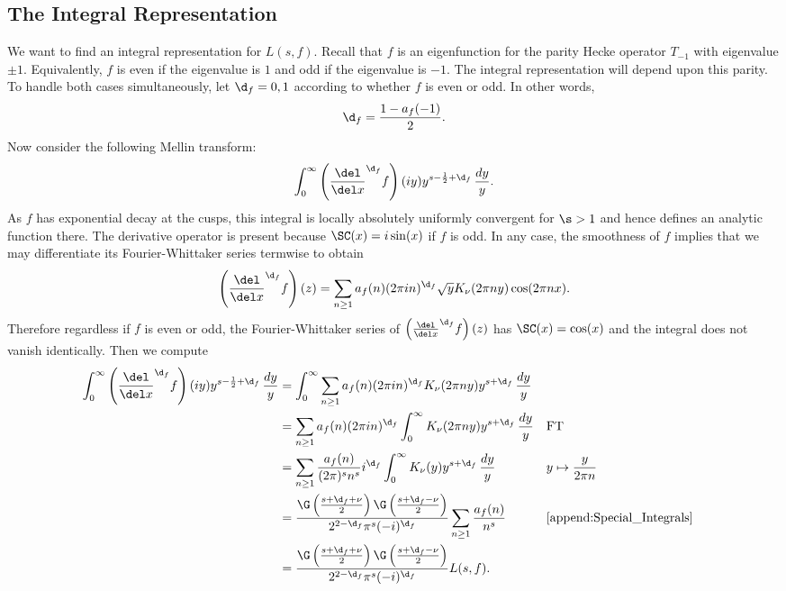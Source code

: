     \subsection*{The Integral Representation}
      We want to find an integral representation for $L(s,f)$. Recall that $f$ is an eigenfunction for the parity Hecke operator $T_{-1}$ with eigenvalue $\pm 1$. Equivalently, $f$ is even if the eigenvalue is $1$ and odd if the eigenvalue is $-1$. The integral representation will depend upon this parity. To handle both cases simultaneously, let $\d_{f} = 0,1$ according to whether $f$ is even or odd. In other words,
      \[
        \d_{f} = \frac{1-a_{f}(-1)}{2}.
      \]
      Now consider the following Mellin transform:
      \[
        \int_{0}^{\infty}\left(\frac{\del}{\del x}^{\d_{f}}f\right)(iy)y^{s-\frac{1}{2}+\d_{f}}\,\frac{dy}{y}.
      \]
      As $f$ has exponential decay at the cusps, this integral is locally absolutely uniformly convergent for $\s > 1$ and hence defines an analytic function there. The derivative operator is present because $\SC(x) = i\sin(x)$ if $f$ is odd. In any case, the smoothness of $f$ implies that we may differentiate its Fourier-Whittaker series termwise to obtain
      \[
        \left(\frac{\del}{\del x}^{\d_{f}}f\right)(z) = \sum_{n \ge 1}a_{f}(n)(2\pi in)^{\d_{f}}\sqrt{y}K_{\nu}(2\pi ny)\cos(2\pi nx).
      \]
      Therefore regardless if $f$ is even or odd, the Fourier-Whittaker series of $\left(\frac{\del}{\del x}^{\d_{f}}f\right)(z)$ has $\SC(x) = \cos(x)$ and the integral does not vanish identically. Then we compute
      \begin{align*}
        \int_{0}^{\infty}\left(\frac{\del}{\del x}^{\d_{f}}f\right)(iy)y^{s-\frac{1}{2}+\d_{f}}\,\frac{dy}{y} &= \int_{0}^{\infty}\sum_{n \ge 1}a_{f}(n)(2\pi in)^{\d_{f}}K_{\nu}(2\pi ny)y^{s+\d_{f}}\,\frac{dy}{y} \\
        &= \sum_{n \ge 1}a_{f}(n)(2\pi in)^{\d_{f}}\int_{0}^{\infty}K_{\nu}(2\pi ny)y^{s+\d_{f}}\,\frac{dy}{y} &&\text{FT} \\
        &= \sum_{n \ge 1}\frac{a_{f}(n)}{(2\pi)^{s}n^{s}}i^{\d_{f}}\int_{0}^{\infty}K_{\nu}(y)y^{s+\d_{f}}\,\frac{dy}{y} &&\text{$y \mapsto \frac{y}{2\pi n}$} \\
        &= \frac{\G\left(\frac{s+\d_{f}+\nu}{2}\right)\G\left(\frac{s+\d_{f}-\nu}{2}\right)}{2^{2-\d_{f}}\pi^{s}(-i)^{\d_{f}}}\sum_{n \ge 1}\frac{a_{f}(n)}{n^{s}} && \text{\cref{append:Special_Integrals}} \\
        &= \frac{\G\left(\frac{s+\d_{f}+\nu}{2}\right)\G\left(\frac{s+\d_{f}-\nu}{2}\right)}{2^{2-\d_{f}}\pi^{s}(-i)^{\d_{f}}}L(s,f).
      \end{align*}
